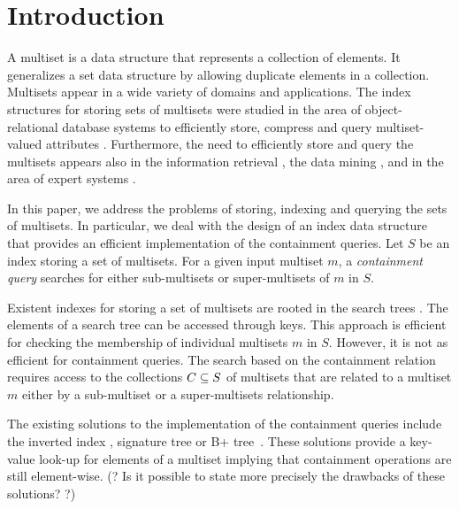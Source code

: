\section{Introduction} \label{c:introduction}
%
%
A multiset is a data structure that represents a collection of elements. It generalizes a set data structure by allowing duplicate elements in a collection. Multisets appear in a wide variety of domains and applications. The index structures for storing sets of multisets were studied in the area of object-relational database systems to efficiently store, compress and query multiset-valued attributes \cite{bouros2016set,gripon2012compressing,ross2004symmetric,steinruecken2015compressing}. Furthermore, the need to efficiently store and query the multisets appears also in the information retrieval \cite{manningBook}, the data mining \cite{interestingSets}, and in the area of expert systems \cite{reteAlgorithm}. 
%

In this paper, we address the problems of storing, indexing and querying the sets of multisets. In particular, we deal with the design of an index data structure that provides an efficient implementation of the containment queries. Let $S$ be an index storing a set of multisets. For a given input multiset $m$, a \emph{containment query} searches for either sub-multisets or super-multisets of $m$ in $S$. 

Existent indexes for storing a set of multisets are rooted in the search trees \cite{rivestBook}. The elements of a search tree can be accessed through keys. This approach is efficient for checking the membership of individual multisets $m$ in $S$. However, it is not as efficient for  containment queries. The search based on the containment relation requires access to the collections $C\subseteq\/S$ of multisets that are related to a multiset $m$ either by a sub-multiset or a super-multisets relationship. 

The existing solutions to the implementation of the containment queries include the inverted index \cite{manningBook}, signature tree \cite{} or B+ tree~\cite{Helmer2003}. These solutions provide a key-value look-up for elements of a multiset implying that containment operations are still element-wise. (? Is it possible to state more precisely the drawbacks of these solutions? ?) 

